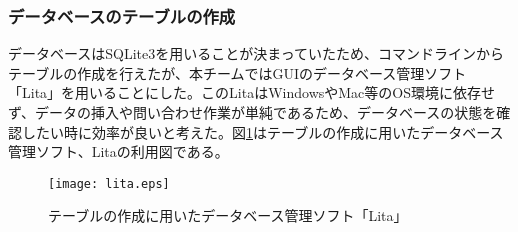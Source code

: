 ﻿\subsubsection{データベースのテーブルの作成}
データベースはSQLite3を用いることが決まっていたため、コマンドラインからテーブルの作成を行えたが、本チームではGUIのデータベース管理ソフト「Lita」を用いることにした。このLitaはWindowsやMac等のOS環境に依存せず、データの挿入や問い合わせ作業が単純であるため、データベースの状態を確認したい時に効率が良いと考えた。図\ref{fig:lita}はテーブルの作成に用いたデータベース管理ソフト、Litaの利用図である。

 \begin{figure}[h]
 \centering
 \texttt{[image: lita.eps]}
 \caption{テーブルの作成に用いたデータベース管理ソフト「Lita」}
 \label{fig:lita}
 \end{figure}

